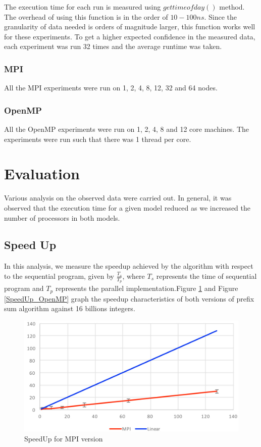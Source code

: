 \documentclass[11pt]{article}
\begin{document}
The execution time for each run is measured using $gettimeofday()$ method. The overhead of using this function is in the order of $10-100 ns$. Since the granularity of data needed is orders of magnitude larger, this function works well for these experiments. To get a higher expected confidence in the measured data, each experiment was run 32 times and the average runtime was taken.

\subsubsection{MPI}

All the MPI experiments were run on 1, 2, 4, 8, 12, 32 and 64 nodes. 

\subsubsection{OpenMP}

All the OpenMP experiments were run on 1, 2, 4, 8 and 12 core machines. The experiments were run such that there was 1 thread per core.

\section{Evaluation}

Various analysis on the observed data were carried out. In general, it was observed that the execution time for a given model reduced as we increased the number of processors in both models.

\subsection{Speed Up}

In this analysis, we measure the speedup achieved by the algorithm with respect to the sequential program, given by $\frac{T_{s}}{T_{p}}$, where $T_{s}$ represents the time of sequential program and $T_{p}$ represents the parallel implementation.Figure \ref{SpeedUp_MPI} and Figure \ref{SpeedUp_OpenMP} graph the speedup characteristics of both versions of prefix sum algorithm against 16 billions integers.

\begin{figure}[h!]
    \centering
        \includegraphics[scale=0.22]{SpeedUp_MPI.jpg}
        \caption{SpeedUp for MPI version}
        \label{SpeedUp_MPI}
    \centering
\end{figure}
\end{document}
